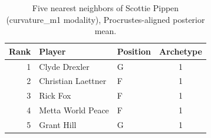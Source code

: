 \begin{table}[htbp]
  \centering\small
  \begin{tabular}{rllc}
    \toprule
    Rank & Player & Position & Archetype \\
    \midrule
    1 & Clyde Drexler & G & 1 \\
    2 & Christian Laettner & F & 1 \\
    3 & Rick Fox & F & 1 \\
    4 & Metta World Peace & F & 1 \\
    5 & Grant Hill & G & 1 \\
    \bottomrule
  \end{tabular}
  \caption{Five nearest neighbors of Scottie Pippen (curvature_m1 modality), Procrustes-aligned posterior mean.}
  \label{tab:Scottie_Pippen_neighbors_curvature_m1}
\end{table}

